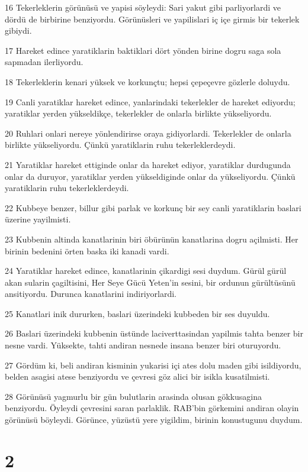 \par 16 Tekerleklerin görünüsü ve yapisi söyleydi: Sari yakut gibi parliyorlardi ve dördü de birbirine benziyordu. Görünüsleri ve yapilislari iç içe girmis bir tekerlek gibiydi.
\par 17 Hareket edince yaratiklarin baktiklari dört yönden birine dogru saga sola sapmadan ilerliyordu.
\par 18 Tekerleklerin kenari yüksek ve korkunçtu; hepsi çepeçevre gözlerle doluydu.
\par 19 Canli yaratiklar hareket edince, yanlarindaki tekerlekler de hareket ediyordu; yaratiklar yerden yükseldikçe, tekerlekler de onlarla birlikte yükseliyordu.
\par 20 Ruhlari onlari nereye yönlendirirse oraya gidiyorlardi. Tekerlekler de onlarla birlikte yükseliyordu. Çünkü yaratiklarin ruhu tekerleklerdeydi.
\par 21 Yaratiklar hareket ettiginde onlar da hareket ediyor, yaratiklar durdugunda onlar da duruyor, yaratiklar yerden yükseldiginde onlar da yükseliyordu. Çünkü yaratiklarin ruhu tekerleklerdeydi.
\par 22 Kubbeye benzer, billur gibi parlak ve korkunç bir sey canli yaratiklarin baslari üzerine yayilmisti.
\par 23 Kubbenin altinda kanatlarinin biri öbürünün kanatlarina dogru açilmisti. Her birinin bedenini örten baska iki kanadi vardi.
\par 24 Yaratiklar hareket edince, kanatlarinin çikardigi sesi duydum. Gürül gürül akan sularin çagiltisini, Her Seye Gücü Yeten'in sesini, bir ordunun gürültüsünü ansitiyordu. Durunca kanatlarini indiriyorlardi.
\par 25 Kanatlari inik dururken, baslari üzerindeki kubbeden bir ses duyuldu.
\par 26 Baslari üzerindeki kubbenin üstünde laciverttasindan yapilmis tahta benzer bir nesne vardi. Yüksekte, tahti andiran nesnede insana benzer biri oturuyordu.
\par 27 Gördüm ki, beli andiran kisminin yukarisi içi ates dolu maden gibi isildiyordu, belden asagisi atese benziyordu ve çevresi göz alici bir isikla kusatilmisti.
\par 28 Görünüsü yagmurlu bir gün bulutlarin arasinda olusan gökkusagina benziyordu. Öyleydi çevresini saran parlaklik. RAB'bin görkemini andiran olayin görünüsü böyleydi. Görünce, yüzüstü yere yigildim, birinin konustugunu duydum.

\chapter{2}

